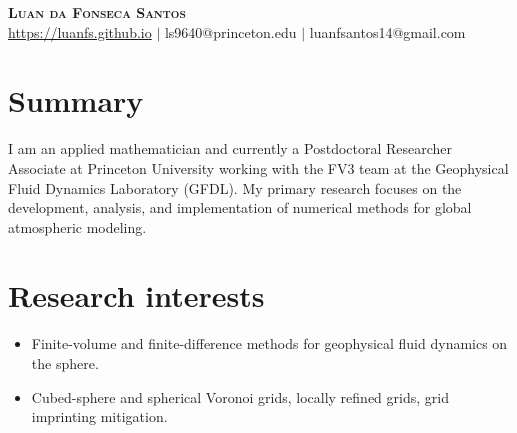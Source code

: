 \documentclass[letterpaper,11pt]{article}
\begin{document}

\begin{center}
    \textbf{\Huge \scshape Luan da Fonseca Santos} \\ \vspace{1pt}
    \href{https://luanfs.github.io}{https://luanfs.github.io} $|$
    ls9640@princeton.edu
    $|$  
    {luanfsantos14@gmail.com} 
\end{center}

\section{Summary}
I am an applied mathematician and currently a Postdoctoral Researcher Associate at Princeton University working with the FV3 team at the Geophysical Fluid Dynamics Laboratory (GFDL).
My primary research focuses on the development, analysis, and implementation of numerical methods for global atmospheric modeling.

\section{Research interests}
\begin{itemize}
	\item Finite-volume and finite-difference methods for geophysical fluid dynamics on the sphere.
	\item Cubed-sphere and spherical Voronoi grids, locally refined grids, grid imprinting mitigation.
\end{itemize}

\end{document}
